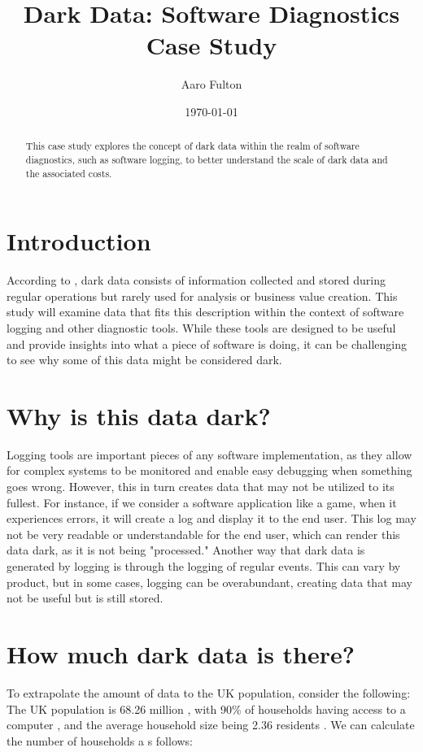 \documentclass{article}
\title{Dark Data: Software Diagnostics Case Study}
\author{Aaro Fulton}
\date{\today}
\begin{document}
\maketitle

\begin{abstract}
This case study explores the concept of dark data within the realm of software diagnostics, such as software logging, to better understand the scale of dark data 
and the associated costs.
\end{abstract}

\section{Introduction}
According to \textcite{gartner_dark_data}, dark data consists of information collected and stored during regular operations but rarely used for analysis or business 
value creation. This study will examine data that fits this description within the context of software logging and other diagnostic tools. While these tools are 
designed to be useful and provide insights into what a piece of software is doing, it can be challenging to see why some of this data might be considered dark.

\section{Why is this data dark?}
Logging tools are important pieces of any software implementation, as they allow for complex systems to be monitored and enable easy debugging when something goes 
wrong. However, this in turn creates data that may not be utilized to its fullest. For instance, if we consider a software application like a game, when it 
experiences errors, it will create a log and display it to the end user. This log may not be very readable or understandable for the end user, which can render this 
data dark, as it is not being "processed." Another way that dark data is generated by logging is through the logging of regular events. This can vary by product, but 
in some cases, logging can be overabundant, creating data that may not be useful but is still stored.

\section{How much dark data is there?}
To extrapolate the amount of data to the UK population, consider the following: The UK population is 68.26 million \textcite{ons_population}, with 90\% of households having access to a 
computer \textcite{ons_technology}, and the average household size being 2.36 residents \textcite{ons_household_size}. We can calculate the number of households a
s follows:
\end{document}
